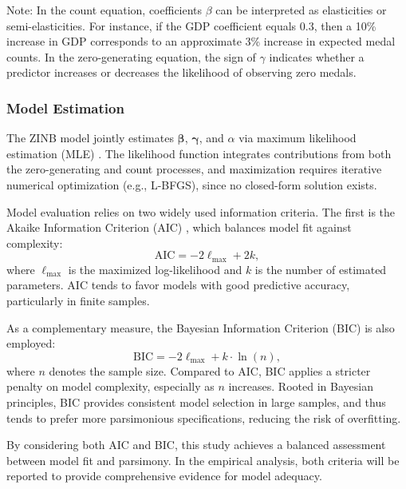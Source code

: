 \documentclass[11pt,twoside]{article}
\numberwithin{Theorem}{section}
\numberwithin{Definition}{section}
\numberwithin{Lemma}{section}
\numberwithin{Algorithm}{section}
\numberwithin{equation}{section}
\begin{document}
Note: In the count equation, coefficients $\beta$ can be interpreted as elasticities or semi-elasticities. For instance, if the GDP coefficient equals 0.3, then a 10\% increase in GDP corresponds to an approximate 3\% increase in expected medal counts. In the zero-generating equation, the sign of $\gamma$ indicates whether a predictor increases or decreases the likelihood of observing zero medals.  

\subsubsection{Model Estimation}

The ZINB model jointly estimates $\boldsymbol{\beta}$, $\boldsymbol{\gamma}$, and $\alpha$ via maximum likelihood estimation (MLE) \citep{seabold2010}. The likelihood function integrates contributions from both the zero-generating and count processes, and maximization requires iterative numerical optimization (e.g., L-BFGS), since no closed-form solution exists.  

Model evaluation relies on two widely used information criteria. The first is the Akaike Information Criterion (AIC) \citep{akaike1974}, which balances model fit against complexity:  
\begin{equation}
\mathrm{AIC} = -2\ell_{\max} + 2k,
\label{eq:aic}
\end{equation}
where $\ell_{\max}$ is the maximized log-likelihood and $k$ is the number of estimated parameters. AIC tends to favor models with good predictive accuracy, particularly in finite samples.  

As a complementary measure, the Bayesian Information Criterion (BIC) \citep{schwarz1978} is also employed:  
\begin{equation}
\mathrm{BIC} = -2\ell_{\max} + k \cdot \ln(n),
\label{eq:bic}
\end{equation}
where $n$ denotes the sample size. Compared to AIC, BIC applies a stricter penalty on model complexity, especially as $n$ increases. Rooted in Bayesian principles, BIC provides consistent model selection in large samples, and thus tends to prefer more parsimonious specifications, reducing the risk of overfitting.  

By considering both AIC and BIC, this study achieves a balanced assessment between model fit and parsimony. In the empirical analysis, both criteria will be reported to provide comprehensive evidence for model adequacy.  


\end{document}
